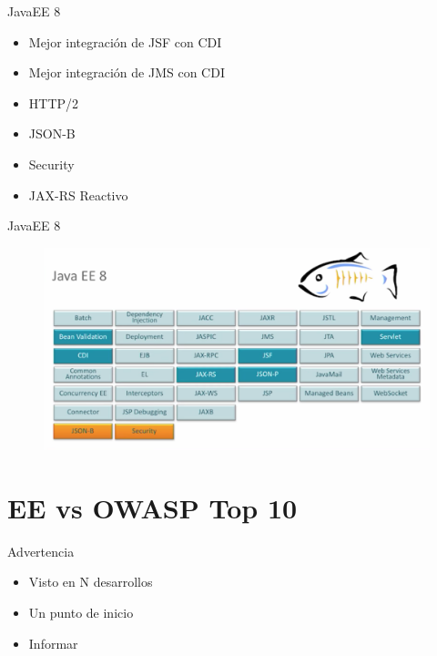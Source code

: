 \documentclass[aspectratio=169]{beamer}
\begin{document}
\begin{frame}{JavaEE 8}
    \begin{itemize}
        \item Mejor integración de JSF con CDI
        \item Mejor integración de JMS con CDI
        \item HTTP/2
        \item JSON-B
        \item Security
        \item JAX-RS Reactivo
    \end{itemize}
\end{frame}

\begin{frame}{JavaEE 8}
    \begin{figure}
        \centering
        \includegraphics[width=0.9\linewidth]{Images/javaee8}
    \end{figure}
\end{frame}


\section{EE vs OWASP Top 10}

\begin{frame}{Advertencia}
    \begin{itemize}
        \item Visto en N desarrollos
        \item Un punto de inicio
        \item Informar
    \end{itemize}
\end{frame}
\end{document}
